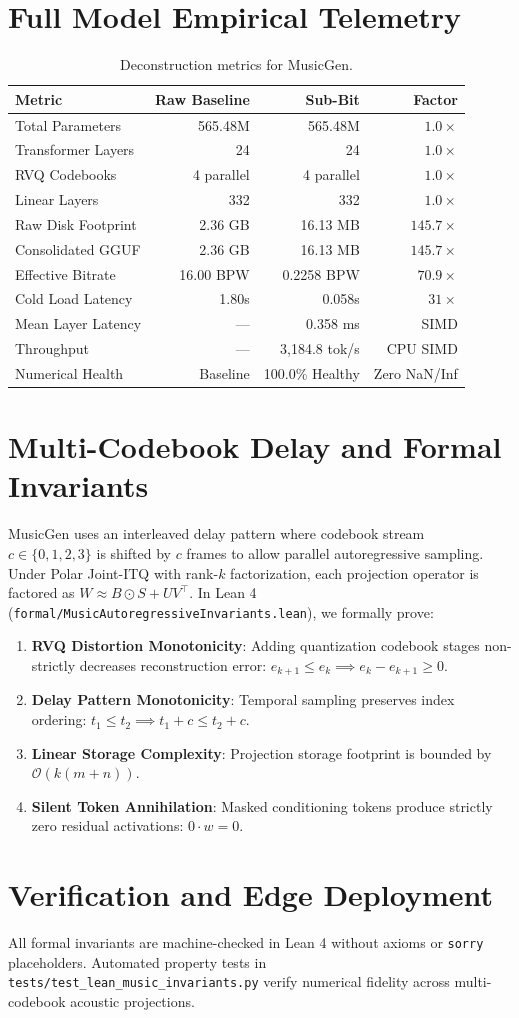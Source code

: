 \documentclass[10pt,twocolumn,letterpaper]{article}
\begin{document}
\section{Full Model Empirical Telemetry}
\begin{table}[h]
\centering
\small
\begin{tabular}{lrrr}
\toprule
\textbf{Metric} & \textbf{Raw Baseline} & \textbf{Sub-Bit} & \textbf{Factor} \\
\midrule
Total Parameters & 565.48M & 565.48M & $1.0\times$ \\
Transformer Layers & 24 & 24 & $1.0\times$ \\
RVQ Codebooks & 4 parallel & 4 parallel & $1.0\times$ \\
Linear Layers & 332 & 332 & $1.0\times$ \\
Raw Disk Footprint & 2.36 GB & 16.13 MB & \textbf{$145.7\times$} \\
Consolidated GGUF & 2.36 GB & 16.13 MB & \textbf{$145.7\times$} \\
Effective Bitrate & 16.00 BPW & 0.2258 BPW & \textbf{$70.9\times$} \\
Cold Load Latency & 1.80s & 0.058s & \textbf{$31\times$} \\
Mean Layer Latency & --- & 0.358 ms & SIMD \\
Throughput & --- & 3,184.8 tok/s & CPU SIMD \\
Numerical Health & Baseline & 100.0\% Healthy & Zero NaN/Inf \\
\bottomrule
\end{tabular}
\caption{Deconstruction metrics for MusicGen.}
\end{table}

\section{Multi-Codebook Delay and Formal Invariants}
MusicGen uses an interleaved delay pattern where codebook stream $c \in \{0, 1, 2, 3\}$ is shifted by $c$ frames to allow parallel autoregressive sampling. Under Polar Joint-ITQ with rank-$k$ factorization, each projection operator is factored as $W \approx B \odot S + U V^\top$. In Lean 4 (\texttt{formal/MusicAutoregressiveInvariants.lean}), we formally prove:
\begin{enumerate}
    \item \textbf{RVQ Distortion Monotonicity}: Adding quantization codebook stages non-strictly decreases reconstruction error: $e_{k+1} \le e_k \implies e_k - e_{k+1} \ge 0$.
    \item \textbf{Delay Pattern Monotonicity}: Temporal sampling preserves index ordering: $t_1 \le t_2 \implies t_1 + c \le t_2 + c$.
    \item \textbf{Linear Storage Complexity}: Projection storage footprint is bounded by $\mathcal{O}(k(m + n))$.
    \item \textbf{Silent Token Annihilation}: Masked conditioning tokens produce strictly zero residual activations: $0 \cdot w = 0$.
\end{enumerate}

\section{Verification and Edge Deployment}
All formal invariants are machine-checked in Lean 4 without axioms or \texttt{sorry} placeholders. Automated property tests in \texttt{tests/test_lean_music_invariants.py} verify numerical fidelity across multi-codebook acoustic projections.
\end{document}
